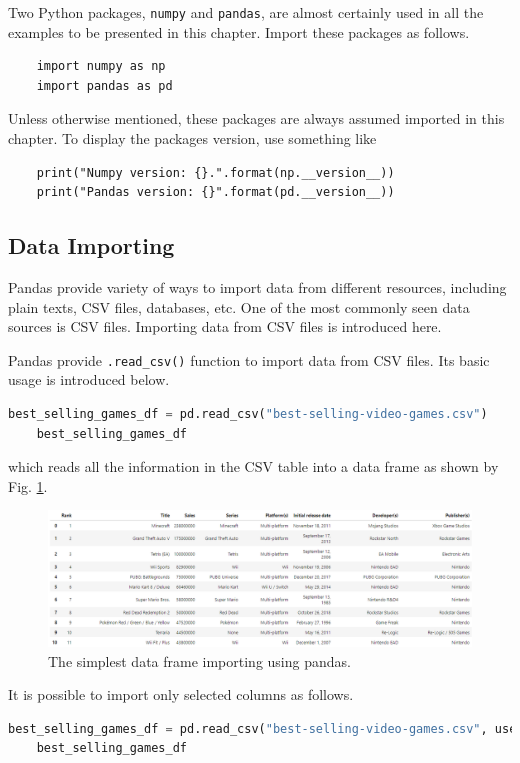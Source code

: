 Two Python packages, \verb|numpy| and \verb|pandas|, are almost certainly used in all the examples to be presented in this chapter. Import these packages as follows.
\begin{lstlisting}
	import numpy as np
	import pandas as pd
\end{lstlisting}
Unless otherwise mentioned, these packages are always assumed imported in this chapter. To display the packages version, use something like
\begin{lstlisting}
	print("Numpy version: {}.".format(np.__version__))
	print("Pandas version: {}".format(pd.__version__))
\end{lstlisting}

\subsection{Data Importing}

Pandas provide variety of ways to import data from different resources, including plain texts, CSV files, databases, etc. One of the most commonly seen data sources is CSV files. Importing data from CSV files is introduced here.

Pandas provide \verb|.read_csv()| function to import data from CSV files. Its basic usage is introduced below.
\begin{lstlisting}[language=python]
	best_selling_games_df = pd.read_csv("best-selling-video-games.csv")
	best_selling_games_df
\end{lstlisting}
which reads all the information in the CSV table into a data frame as shown by Fig. \ref{fig:dfexp}.
\begin{figure}[htbp]
	\centering
	\includegraphics[width=\textwidth]{./chapters/ch-python/figures/df_example.png}
	\caption{The simplest data frame importing using pandas.}
	\label{fig:dfexp}
\end{figure}
It is possible to import only selected columns as follows.
\begin{lstlisting}[language=python]
	best_selling_games_df = pd.read_csv("best-selling-video-games.csv", usecols = ["Title", "Sales", "Publisher(s)"])
	best_selling_games_df
\end{lstlisting}

